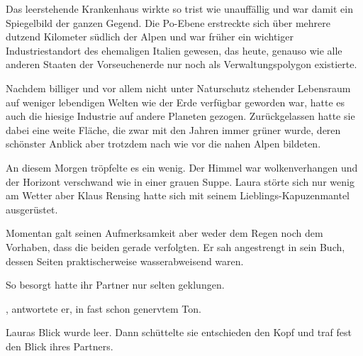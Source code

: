 Das leerstehende Krankenhaus wirkte so trist wie unauffällig und war damit ein Spiegelbild der ganzen Gegend. Die Po-Ebene erstreckte sich über mehrere dutzend Kilometer südlich der Alpen und war früher ein wichtiger Industriestandort des ehemaligen Italien gewesen, das heute, genauso wie alle anderen Staaten der Vorseuchenerde nur noch als Verwaltungspolygon existierte.

\par

Nachdem billiger und vor allem nicht unter Naturschutz stehender Lebensraum auf weniger lebendigen Welten wie der Erde verfügbar geworden war, hatte es auch die hiesige Industrie auf andere Planeten gezogen. Zurückgelassen hatte sie dabei eine weite Fläche, die zwar mit den Jahren immer grüner wurde, deren schönster Anblick aber trotzdem nach wie vor die nahen Alpen bildeten.

\par

An diesem Morgen tröpfelte es ein wenig. Der Himmel war wolkenverhangen und der Horizont verschwand wie in einer grauen Suppe. Laura störte sich nur wenig am Wetter aber Klaus Rensing hatte sich mit seinem Lieblings-Kapuzenmantel ausgerüstet.

\par

Momentan galt seinen Aufmerksamkeit aber weder dem Regen noch dem Vorhaben, dass die beiden gerade verfolgten. Er sah angestrengt in sein Buch, dessen Seiten praktischerweise wasserabweisend waren.

\par

So besorgt hatte ihr Partner nur selten geklungen.

\par


\par

, antwortete er, in fast schon genervtem Ton. 

\par

Lauras Blick wurde leer.  Dann schüttelte sie entschieden den Kopf und traf fest den Blick ihres Partners. 

